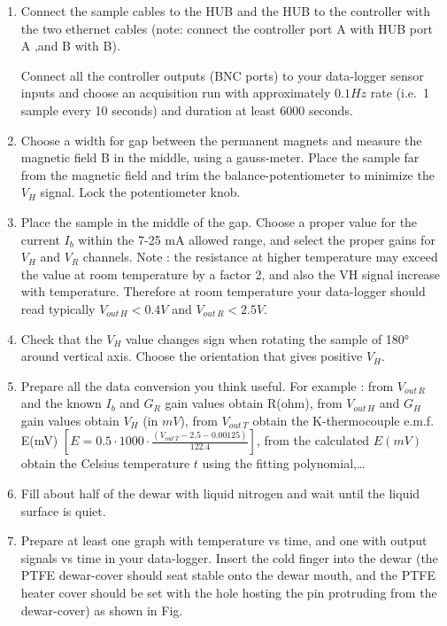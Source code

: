 \documentclass[]{book}
\begin{document}
\begin{enumerate}
\def\labelenumi{\arabic{enumi}.}
\item
  Connect the sample cables to the HUB and the HUB to the controller
  with the two ethernet cables (note: connect the controller port A with
  HUB port A ,and B with B).

  Connect all the controller outputs (BNC ports) to your data-logger
  sensor inputs and choose an acquisition run with approximately
  \(0.1Hz\) rate (i.e.~1 sample every 10 seconds) and duration at least
  6000 seconds.
\item
  Choose a width for gap between the permanent magnets and measure the
  magnetic field B in the middle, using a gauss-meter. Place the sample
  far from the magnetic field and trim the balance-potentiometer to
  minimize the \(V_H\) signal. Lock the potentiometer knob.
\item
  Place the sample in the middle of the gap. Choose a proper value for
  the current \(I_b\) within the 7-25 mA allowed range, and select the
  proper gains for \(V_H\) and \(V_R\) channels. Note : the resistance
  at higher temperature may exceed the value at room temperature by a
  factor 2, and also the VH signal increase with temperature. Therefore
  at room temperature your data-logger should read typically
  \(V_{out \, H} <0.4V\) and \(V_{out \, R}<2.5V\).
\item
  Check that the \(V_H\) value changes sign when rotating the sample of
  180° around vertical axis. Choose the orientation that gives positive
  \(V_H\).
\item
  Prepare all the data conversion you think useful. For example : from
  \(V_{out \, R}\) and the known \(I_b\) and \(G_R\) gain values obtain
  R(ohm), from \(V_{out \, H}\) and \(G_H\) gain values obtain \(V_H\)
  (in \(mV\)), from \(V_{out \, T}\) obtain the K-thermocouple e.m.f.
  E(mV)
  \([E=0.5 \cdot 1000 \cdot \frac{ (V_{out \, T}-2.5-0.00125)}{122.4}]\),
  from the calculated \(E(mV)\) obtain the Celsius temperature \(t\)
  using the fitting polynomial,\ldots{}
\item
  Fill about half of the dewar with liquid nitrogen and wait until the
  liquid surface is quiet.
\item
  Prepare at least one graph with temperature vs time, and one with
  output signals vs time in your data-logger. Insert the cold finger
  into the dewar (the PTFE dewar-cover should seat stable onto the dewar
  mouth, and the PTFE heater cover should be set with the hole hosting
  the pin protruding from the dewar-cover) as shown in Fig.

\end{enumerate}
\end{document}
